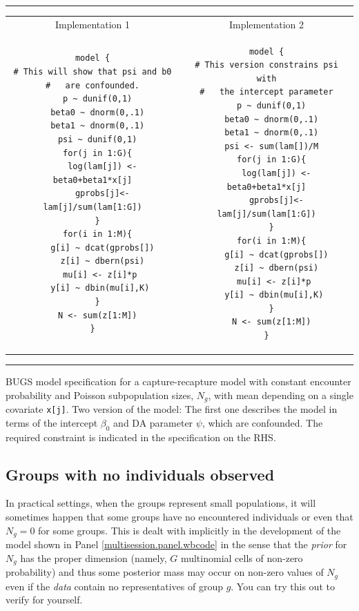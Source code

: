 \begin{panel}[htp]
\renewcommand{\baselinestretch}{1.0}
\centering
\rule[0.15in]{\textwidth}{.03in}
\begin{tabular}{cc}
Implementation 1 & Implementation 2 \\
\begin{minipage}{2.25in}
{\small
\begin{verbatim}
model {
# This will show that psi and b0
#   are confounded.
  p ~ dunif(0,1)
  beta0 ~ dnorm(0,.1)
  beta1 ~ dnorm(0,.1)
  psi ~ dunif(0,1)
  for(j in 1:G){
    log(lam[j]) <- beta0+beta1*x[j]
    gprobs[j]<-lam[j]/sum(lam[1:G])
  }
  for(i in 1:M){
    g[i] ~ dcat(gprobs[])
    z[i] ~ dbern(psi)
   mu[i] <- z[i]*p
   y[i] ~ dbin(mu[i],K)
  }
  N <- sum(z[1:M])
}
\end{verbatim}
}
\end{minipage}
&
\begin{minipage}{2.25in}
{\small
\begin{verbatim}
model {
# This version constrains psi with
#   the intercept parameter
  p ~ dunif(0,1)
  beta0 ~ dnorm(0,.1)
  beta1 ~ dnorm(0,.1)
  psi <- sum(lam[])/M
  for(j in 1:G){
    log(lam[j]) <- beta0+beta1*x[j]
    gprobs[j]<-lam[j]/sum(lam[1:G])
  }
  for(i in 1:M){
    g[i] ~ dcat(gprobs[])
    z[i] ~ dbern(psi)
   mu[i] <- z[i]*p
   y[i] ~ dbin(mu[i],K)
  }
  N <- sum(z[1:M])
}
\end{verbatim}
}
\end{minipage}
\end{tabular}
\rule[-0.15in]{\textwidth}{.03in}
\caption{BUGS model specification for a capture-recapture model with
  constant encounter probability and Poisson subpopulation sizes,
  $N_{g}$, with mean depending on a single covariate \mbox{\tt x[j]}.
Two version of the model: The first one describes the model in terms
of the intercept $\beta_0$ and DA parameter $\psi$, which are
confounded. The required constraint is indicated in the specification
on the RHS.
}
\label{multisession.panel.wbcode}
\end{panel}

\subsection{Groups with no individuals observed}

In practical settings, when the groups represent small populations, it
will sometimes happen that some groups have no encountered individuals
or even that $N_{g} = 0$ for some groups. This is dealt with
implicitly in the development of the model shown in Panel
\ref{multisession.panel.wbcode} in the sense that the {\it prior} for
$N_{g}$ has the proper dimension (namely, $G$ multinomial cells of
non-zero probability) and thus some posterior mass may occur on
non-zero values of $N_{g}$ even if the {\it data} contain no
representatives of group $g$.  You can try this out to verify for
yourself.



